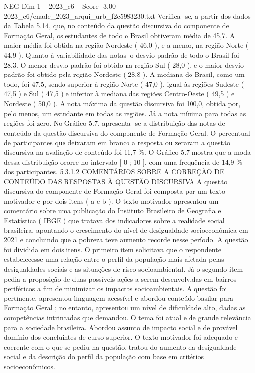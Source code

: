 \begin{textsample}{NEG Dim 1 – 2023\_c6 – Score -3.00 – 2023\_c6/enade\_2023\_arqui\_urb\_f2c5983230.txt}
Verifica -se, a partir dos dados da Tabela 5.14, que, no conteúdo da questão discursiva do componente de Formação Geral, os estudantes de todo o Brasil obtiveram média de 45,7.
A maior média foi obtida na região Nordeste ( 46,0 ), e a menor, na região Norte ( 44,9 ).
Quanto à variabilidade das notas, o desvio-padrão de todo o Brasil foi 28,3.
O menor desvio-padrão foi obtido na região Sul ( 28,0 ), e o maior desvio-padrão foi obtido pela região Nordeste ( 28,8 ).
A mediana do Brasil, como um todo, foi 47,5, sendo superior à região Norte ( 47,0 ), igual às regiões Sudeste ( 47,5 ) e Sul ( 47,5 ) e inferior à mediana das regiões Centro-Oeste ( 49,5 ) e Nordeste ( 50,0 ).
A nota máxima da questão discursiva foi 100,0, obtida por, pelo menos, um estudante em todas as regiões.
Já a nota mínima para todas as regiões foi zero.
No Gráfico 5.7, apresenta -se a distribuição das notas de conteúdo da questão discursiva do componente de Formação Geral.
O percentual de participantes que deixaram em branco a resposta ou zeraram a questão discursiva na avaliação de conteúdo foi 11,7 \%.
O Gráfico 5.7 mostra que a moda dessa distribuição ocorre no intervalo [ 0 ; 10 ], com uma frequência de 14,9 \% dos participantes. 5.3.1.2 COMENTÁRIOS SOBRE A CORREÇÃO DE CONTEÚDO DAS RESPOSTAS À QUESTÃO DISCURSIVA A questão discursiva do componente de Formação Geral foi composta por um texto motivador e por dois itens ( a e b ).
O texto motivador apresentou um comentário sobre uma publicação do Instituto Brasileiro de Geografia e Estatística ( IBGE ) que tratava dos indicadores sobre a realidade social brasileira, apontando o crescimento do nível de desigualdade socioeconômica em 2021 e concluindo que a pobreza teve aumento recorde nesse período.
A questão foi dividida em dois itens.
O primeiro item solicitava que o respondente estabelecesse uma relação entre o perfil da população mais afetada pelas desigualdades sociais e as situações de risco socioambiental.
Já o segundo item pedia a proposição de duas possíveis ações a serem desenvolvidas em bairros periféricos a fim de minimizar os impactos socioambientais.
A questão foi pertinente, apresentou linguagem acessível e abordou conteúdo basilar para Formação Geral ; no entanto, apresentou um nível de dificuldade alto, dadas as competências intrincadas que demandou.
O tema foi atual e de grande relevância para a sociedade brasileira.
Abordou assunto de impacto social e de provável domínio dos concluintes de curso superior.
O texto motivador foi adequado e coerente com o que se pediu na questão, tratou do aumento da desigualdade social e da descrição do perfil da população com base em critérios socioeconômicos.

\end{textsample}

